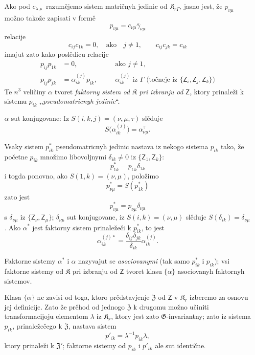 \documentclass[11pt]{article}
\begin{document}
Ako pod \(c_{\lambda\varrho}\) razumějemo sistem matričnyh jedinic od \(\mathfrak K_{r\Gamma}\), jasno jest, že \(p_{\nu\mu}\) možno takože zapisati v formě
\[
p_{\nu\mu}=c_{\nu\mu}\bar\gamma_{\nu\mu}
\]
relacije
\[
c_{ij}c_{1k}=0,\quad\text{ako}\quad j\ne1,
\qquad
c_{ij}c_{jk}=c_{ik}
\]
imajut zato kako poslědicu relacije
\[
\begin{aligned}
p_{ij}p_{1k}&=0,\quad &&\text{ako }j\ne1,\\
p_{ij}p_{jk}&=\alpha_{ik}^{(j)}p_{ik},\quad
&&\alpha_{ik}^{(j)}\text{ iz }\Gamma\text{ (točneje iz }\{\mathsf{Z}_i,\mathsf{Z}_j,\mathsf{Z}_k\}\text{)}
\end{aligned}
\]
Te \(n^3\) veličiny \(\alpha\) tvoret \emph{faktorny sistem od \(\mathfrak K\) pri izbranju od \(\mathsf{Z}\)}, ktory prinaleži k sistemu \(p_{ik}\) ,,\emph{pseudomatricnyh jedinic}``.

\(\alpha\) sut konjugovane: Iz \(S(i,k,j)=(\nu,\mu,\tau)\) slěduje
\[
S\bigl(\alpha_{ik}^{(j)}\bigr)=\alpha_{\nu\mu}^{\tau}.
\]

Vsaky sistem \(p_{ik}^*\) pseudomatricnyh jedinic nastava iz nekogo sistema \(p_{ik}\) tako, že početne \(p_{ik}\) množimo libovoljnymi \(\delta_{ik}\ne0\) iz \(\{\mathsf{Z}_1,\mathsf{Z}_k\}\):
\[
p_{1k}^*=p_{1k}\delta_{1k}
\]
i togda ponovno, ako \(S(1,k)=(\nu,\mu)\), položimo
\[
p_{\nu\mu}^*=S(p_{1k}^*)
\]
zato jest
\[
p_{\nu\mu}^*=p_{\nu\mu}\delta_{\nu\mu}
\]
s \(\delta_{\nu\mu}\) iz \(\{\mathsf{Z}_\nu,\mathsf{Z}_\mu\}\); \(\delta_{\nu\mu}\) sut konjugovane, iz \(S(i,k)=(\nu,\mu)\) slěduje \(S(\delta_{ik})=\delta_{\nu\mu}\). Ako \(\alpha^*\) jest faktorny sistem prinaležeči k \(p_{ik}^*\), to jest
\[
\alpha_{ik}^{(j)*}=\frac{\delta_{ij}\delta_{jk}}{\delta_{ik}}\alpha_{ik}^{(j)}.
\]

Faktorne sistemy \(\alpha^*\) i \(\alpha\) nazyvajut se \emph{asociovanymi} (tak samo \(p_{ik}^*\) i \(p_{ik}\)); vsi faktorne sistemy od \(\mathfrak K\) pri izbranju od \(\mathsf{Z}\) tvoret klasu \(\{\alpha\}\) asociovanyh faktornyh sistemov.

Klasa \(\{\alpha\}\) ne zavisi od toga, ktoro prědstavjenje \(\mathfrak Z\) od \(\mathsf{Z}\) v \(\mathfrak K_r\) izberemo za osnovu jej definicije. Zato že prěhod od jednogo \(\mathfrak Z\) k drugomu možno učiniti transformacijoju elementom \(\lambda\) iz \(\mathfrak K_r\), ktory jest zato \(\mathfrak G\)-invariantny; zato iz sistema \(p_{ik}\), prinaležečego k \(\mathfrak Z\), nastava sistem
\[
p'_{ik}=\lambda^{-1}p_{ik}\lambda,
\]
ktory prinaleži k \(\mathfrak Z'\); faktorne sistemy od \(p_{ik}\) i \(p'_{ik}\) ale sut identične.
\end{document}
